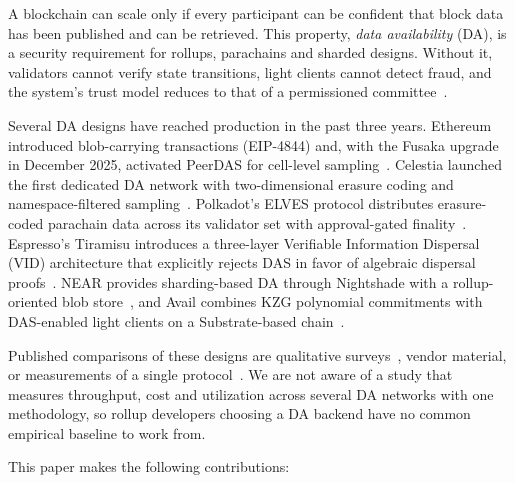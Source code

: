 
A blockchain can scale only if every participant can be confident that block data has been published and can be retrieved.
This property, \emph{data availability} (DA), is a security requirement for rollups, parachains and sharded designs.
Without it, validators cannot verify state transitions, light clients cannot detect fraud, and the system's trust model reduces to that of a permissioned committee~\cite{Saif_Survey_DA_Rollups}.

Several DA designs have reached production in the past three years.
Ethereum introduced blob-carrying transactions (EIP-4844) and, with the Fusaka upgrade in December 2025, activated PeerDAS for cell-level sampling~\cite{EIP-4844, EIP-7594}.
Celestia launched the first dedicated DA network with two-dimensional erasure coding and namespace-filtered sampling~\cite{AlBassam_LazyLedger}.
Polkadot's ELVES protocol distributes erasure-coded parachain data across its validator set with approval-gated finality~\cite{Jeff_Burdges_ELVES}.
Espresso's Tiramisu introduces a three-layer Verifiable Information Dispersal (VID) architecture that explicitly rejects DAS in favor of algebraic dispersal proofs~\cite{Espresso:Hotshot_and_Triamisu}.
NEAR provides sharding-based DA through Nightshade with a rollup-oriented blob store~\cite{NEAR_Nightshade_Scaling_Blockchain}, and Avail combines KZG polynomial commitments with DAS-enabled light clients on a Substrate-based chain~\cite{Avail_The_DA_Blockchain}.

Published comparisons of these designs are qualitative surveys~\cite{Saif_Survey_DA_Rollups, Thibault2022Rollups}, vendor material, or measurements of a single protocol~\cite{Heimbach2025BlobFee, Lee2025BlobSharing}.
We are not aware of a study that measures throughput, cost and utilization across several DA networks with one methodology, so rollup developers choosing a DA backend have no common empirical baseline to work from.

This paper makes the following contributions:

